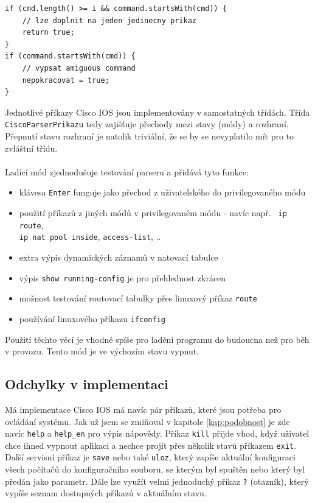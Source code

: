 \begin{verbatim}
if (cmd.length() >= i && command.startsWith(cmd)) {
    // lze doplnit na jeden jedinecny prikaz
    return true;
}
if (command.startsWith(cmd)) {
    // vypsat amiguous command
    nepokracovat = true;
}
\end{verbatim}

Jednotlivé příkazy Cisco IOS jsou implementovány v samostatných třídách. Třída \\\verb|CiscoParserPrikazu| tedy zajišťuje přechody mezi stavy (módy) a  rozhraní. Přepnutí stavu rozhraní je natolik triviální, že se by se nevyplatilo mít pro to zvláštní třídu. 

\paragraph{}
Ladící mód zjednodušuje testování parseru a přidává tyto funkce:
\begin{itemize}
 \item klávesa \verb|Enter| funguje jako přechod z uživatelského do privilegovaného módu
 \item použití příkazů z jiných módů v privilegovaném módu - navíc např. \verb| ip route|, \\\verb|ip nat pool inside|, \verb|access-list|, ..
 \item extra výpis dynamických záznamů v natovací tabulce
 \item výpis \verb|show running-config| je pro přehlednost zkrácen
 \item možnost testování routovací tabulky přes linuxový příkaz \verb|route|
 \item používání linuxového příkazu \verb|ifconfig|
\end{itemize}
Použití těchto věcí je vhodné spíše pro ladění programu do budoucna než pro běh v  provozu. Tento mód je ve výchozím stavu vypnut.

\subsection{Odchylky v implementaci}
Má implementace Cisco IOS má navíc pár příkazů, které jsou potřeba pro ovládání systému. Jak už jsem se zmiňoval v kapitole \ref{kap:podobnost} je zde navíc \verb|help| a \verb|help_en| pro výpis nápovědy. Příkaz \verb|kill| přijde vhod, když uživatel chce ihned vypnout aplikaci a nechce projít přes několik stavů příkazem \verb|exit|. Další servisní příkaz je \verb|save| nebo také \verb|uloz|, který zapíše aktuální konfiguraci všech počítačů do konfiguračního souboru, se kterým byl spuštěn nebo který byl předán jako parametr. Dále lze využít velmi jednoduchý příkaz \verb|?| (otazník), který vypíše seznam dostupných příkazů v aktuálním stavu.

